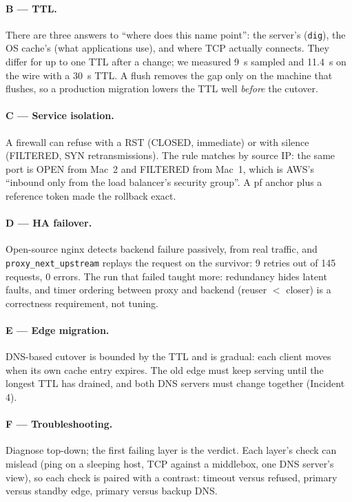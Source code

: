 \documentclass[11pt,a4paper]{article}
\begin{document}
\paragraph{B --- TTL.} There are three answers to ``where does this name point'': the server's
(\texttt{dig}), the OS cache's (what applications use), and where TCP actually connects. They differ
for up to one TTL after a change; we measured 9~s sampled and 11.4~s on the wire with a 30~s TTL. A
flush removes the gap only on the machine that flushes, so a production migration lowers the TTL
well \emph{before} the cutover.

\paragraph{C --- Service isolation.} A firewall can refuse with a RST (CLOSED, immediate) or with
silence (FILTERED, SYN retransmissions). The rule matches by source IP: the same port is OPEN from
Mac~2 and FILTERED from Mac~1, which is AWS's ``inbound only from the load balancer's security
group''. A pf anchor plus a reference token made the rollback exact.

\paragraph{D --- HA failover.} Open-source nginx detects backend failure passively, from real
traffic, and \texttt{proxy\_next\_upstream} replays the request on the survivor: 9 retries out of
145 requests, 0 errors. The run that failed taught more: redundancy hides latent faults, and timer
ordering between proxy and backend (reuser $<$ closer) is a correctness requirement, not tuning.

\paragraph{E --- Edge migration.} DNS-based cutover is bounded by the TTL and is gradual: each
client moves when its own cache entry expires. The old edge must keep serving until the longest
TTL has drained, and both DNS servers must change together (Incident 4).

\paragraph{F --- Troubleshooting.} Diagnose top-down; the first failing layer is the verdict. Each
layer's check can mislead (ping on a sleeping host, TCP against a middlebox, one DNS server's view),
so each check is paired with a contrast: timeout versus refused, primary versus standby edge,
primary versus backup DNS.
\end{document}
